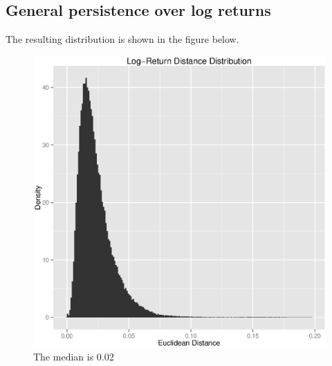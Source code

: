 \documentclass{article}
\begin{document}
\subsection{General persistence over log returns}
The resulting distribution is shown in the figure below. 
\begin{figure}
\begin{center}
\includegraphics[width = 3.5 in, height = 3.5 in]{globplots/lr-dist}
\caption{The median is 0.02}
\label{lrdist}
\end{center}
\end{figure}
\end{document}
